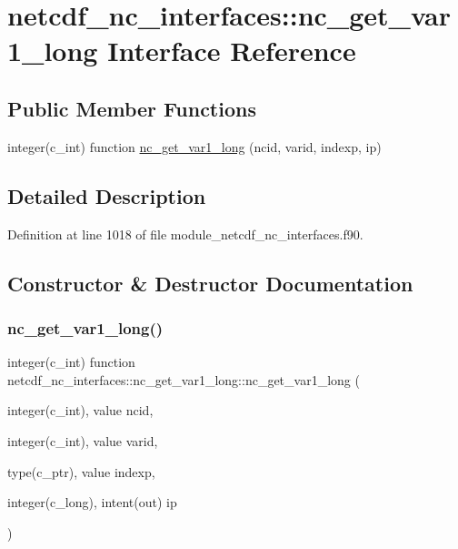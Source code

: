 \hypertarget{interfacenetcdf__nc__interfaces_1_1nc__get__var1__long}{}\section{netcdf\+\_\+nc\+\_\+interfaces\+:\+:nc\+\_\+get\+\_\+var1\+\_\+long Interface Reference}
\label{interfacenetcdf__nc__interfaces_1_1nc__get__var1__long}
\subsection*{Public Member Functions}
\begin{DoxyCompactItemize}
\item 
integer(c\+\_\+int) function \hyperlink{interfacenetcdf__nc__interfaces_1_1nc__get__var1__long_a3097c10cd746746285b0b054922835df}{nc\+\_\+get\+\_\+var1\+\_\+long} (ncid, varid, indexp, ip)
\end{DoxyCompactItemize}


\subsection{Detailed Description}


Definition at line 1018 of file module\+\_\+netcdf\+\_\+nc\+\_\+interfaces.\+f90.



\subsection{Constructor \& Destructor Documentation}
\mbox{\label{interfacenetcdf__nc__interfaces_1_1nc__get__var1__long_a3097c10cd746746285b0b054922835df}} 
\subsubsection{\texorpdfstring{nc\+\_\+get\+\_\+var1\+\_\+long()}{nc\_get\_var1\_long()}}
{\footnotesize\ttfamily integer(c\+\_\+int) function netcdf\+\_\+nc\+\_\+interfaces\+::nc\+\_\+get\+\_\+var1\+\_\+long\+::nc\+\_\+get\+\_\+var1\+\_\+long (\begin{DoxyParamCaption}\item[{integer(c\+\_\+int), value}]{ncid,  }\item[{integer(c\+\_\+int), value}]{varid,  }\item[{type(c\+\_\+ptr), value}]{indexp,  }\item[{integer(c\+\_\+long), intent(out)}]{ip }\end{DoxyParamCaption})}



